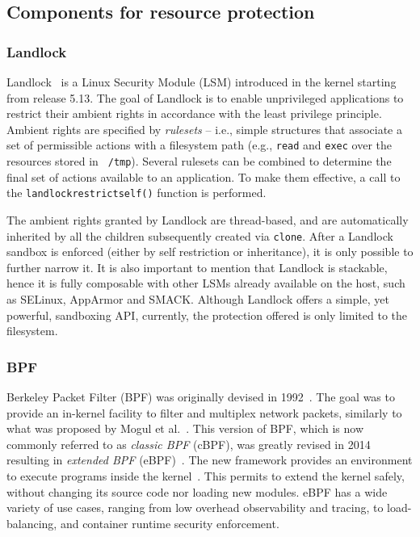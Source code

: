 \subsection{Components for resource protection}
\label{sect:background-sandboxing}

\subsubsection*{Landlock}

Landlock~\cite{landlock} is a Linux Security Module (LSM) introduced
in the kernel starting from release 5.13. The goal of Landlock is to
enable unprivileged applications to restrict their ambient rights in
accordance with the least privilege principle. Ambient rights are
specified by {\em rulesets} -- i.e., simple structures that
associate a set of permissible actions with a filesystem path (e.g.,
{\tt read} and {\tt exec} over the resources stored in {\tt
  /tmp}). Several rulesets can be combined to determine the final set
of actions available to an application. To make them effective, a call
to the {\tt landlock\textunderscore restrict\textunderscore self()}
function is performed.

The ambient rights granted by Landlock are thread-based, and are
automatically inherited by all the children subsequently created via
{\tt clone}. After a Landlock sandbox is enforced (either by self
restriction or inheritance), it is only possible to further narrow it.
It is also important to mention that Landlock is stackable, hence it
is fully composable with other LSMs already available on the host, such
as SELinux, AppArmor and SMACK.
%
Although Landlock offers a simple, yet powerful, sandboxing API,
currently, the protection offered is only limited to the filesystem.


\subsubsection*{BPF}

Berkeley Packet Filter (BPF) was originally devised in
1992~\cite{bpf-usenix93}. The goal was to provide an in-kernel
facility to filter and multiplex network packets, similarly to what
was proposed by Mogul et al.~\cite{mogul1987packer}. This version of
BPF, which is now commonly referred to as {\em classic BPF} (cBPF),
was greatly revised in 2014 resulting in {\em extended BPF}
(eBPF)~\cite{corbet2014eBPF}. The new framework provides an
environment to execute programs inside the kernel~\cite{greggebpf,
  kehoe2022ebpf}. This permits to extend the kernel safely, without
changing its source code nor loading new modules.  eBPF has a wide
variety of use cases, ranging from low overhead observability and
tracing, to load-balancing, and container runtime security
enforcement.

